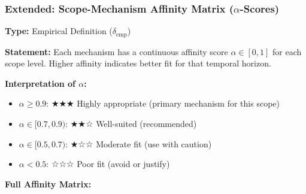 \subsubsection{Extended: Scope-Mechanism Affinity Matrix ($\alpha$-Scores)}
\label{subsubsec:scope-affinity-matrix}

\begin{tcolorbox}[colback=green!5!white, colframe=green!75!black,
    title=\textbf{EIT-EMP-3-D2-EXT: Full Scope-Mechanism Affinity Matrix}]

\textbf{Type:} Empirical Definition ($\delta_{\text{emp}}$)

\textbf{Statement:} Each mechanism has a continuous affinity score $\alpha \in [0,1]$ for each scope level. Higher affinity indicates better fit for that temporal horizon.

\vspace{0.5em}
\textbf{Interpretation of $\alpha$:}
\begin{itemize}[nosep]
    \item $\alpha \geq 0.9$: ★★★ Highly appropriate (primary mechanism for this scope)
    \item $\alpha \in [0.7, 0.9)$: ★★☆ Well-suited (recommended)
    \item $\alpha \in [0.5, 0.7)$: ★☆☆ Moderate fit (use with caution)
    \item $\alpha < 0.5$: ☆☆☆ Poor fit (avoid or justify)
\end{itemize}

\vspace{0.5em}
\textbf{Full Affinity Matrix:}


\end{tcolorbox}
